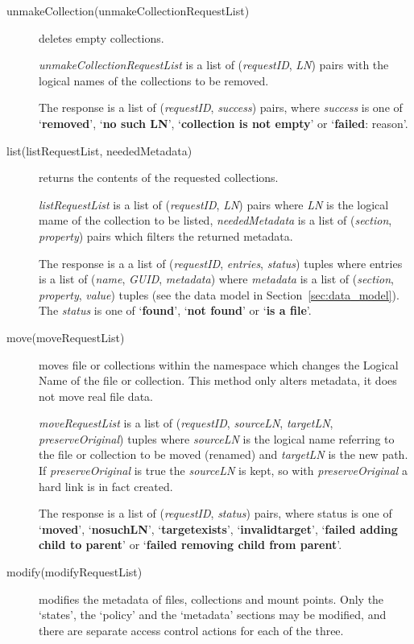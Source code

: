 \documentclass{book}
\begin{document}
\begin{description}
    \item[unmakeCollection(unmakeCollectionRequestList)] deletes empty collections.

    \emph{unmakeCollectionRequestList} is a list of (\emph{requestID}, \emph{LN}) pairs with the logical names of the collections to be removed. 

    The response is a list of (\emph{requestID}, \emph{success}) pairs, where \emph{success} is one of `\textbf{removed}', `\textbf{no such LN}', `\textbf{collection is not empty}' or `\textbf{failed}: reason'.
    
    \item[list(listRequestList, neededMetadata)] returns the contents of the requested collections.
        
    \emph{listRequestList} is a list of (\emph{requestID}, \emph{LN}) pairs where \emph{LN} is the logical mame of the collection to be listed, \emph{neededMetadata} is a list of (\emph{section}, \emph{property}) pairs which filters the returned metadata.
    
    The response is a a list of (\emph{requestID}, \emph{entries}, \emph{status}) tuples where entries is a list of (\emph{name}, \emph{GUID}, \emph{metadata}) where \emph{metadata} is a list of (\emph{section}, \emph{property}, \emph{value}) tuples (see the data model in Section~\ref{sec:data_model}). The \emph{status} is one of `\textbf{found}', `\textbf{not found}' or `\textbf{is a file}'.
    
    \item[move(moveRequestList)] moves file or collections within the namespace which changes the Logical Name of the file or collection. This method only alters metadata, it does not move real file data.

    \emph{moveRequestList} is a list of (\emph{requestID}, \emph{sourceLN}, \emph{targetLN}, \emph{preserveOriginal}) tuples where \emph{sourceLN} is the logical name referring to the file or collection to be moved (renamed) and \emph{targetLN} is the new path. If \emph{preserveOriginal} is true the \emph{sourceLN} is kept, so with \emph{preserveOriginal} a hard link is in fact created.
    
    The response is a list of (\emph{requestID}, \emph{status}) pairs, where status is one of `\textbf{moved}', `\textbf{nosuchLN}', `\textbf{targetexists}', `\textbf{invalidtarget}', `\textbf{failed adding child to parent}' or `\textbf{failed removing child from parent}'.
    
    \item[modify(modifyRequestList)] modifies the metadata of files, collections and mount points. Only the `states', the `policy' and the `metadata' sections may be modified, and there are separate access control actions for each of the three.
    

\end{description}
\end{document}
